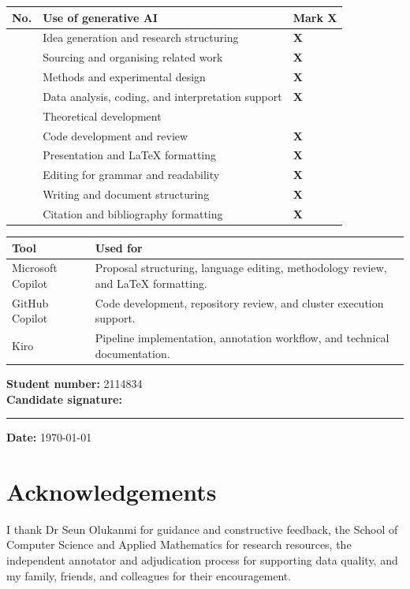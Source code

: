 \documentclass[11pt,a4paper]{article}
\newcommand{\AIyes}{\textbf{X}}
\newcommand{\AIno}{\phantom{X}}
\begin{document}
\vspace{0.35cm}
\begin{tabularx}{\textwidth}{|>{\centering\arraybackslash}p{0.8cm}|Y|>{\centering\arraybackslash}p{1.3cm}|}
\hline
\textbf{No.} & \textbf{Use of generative AI} & \textbf{Mark X}\\  & Idea generation and research structuring & \AIyes\\  & Sourcing and organising related work & \AIyes\\  & Methods and experimental design & \AIyes\\  & Data analysis, coding, and interpretation support & \AIyes\\  & Theoretical development & \AIno\\  & Code development and review & \AIyes\\  & Presentation and LaTeX formatting & \AIyes\\  & Editing for grammar and readability & \AIyes\\  & Writing and document structuring & \AIyes\\  & Citation and bibliography formatting & \AIyes\\ \hline
\end{tabularx}

\vspace{0.4cm}
\begin{tabularx}{\textwidth}{|p{3.4cm}|Y|}
\hline
\textbf{Tool} & \textbf{Used for}\\ \hline
Microsoft Copilot & Proposal structuring, language editing, methodology review, and LaTeX formatting.\\ \hline
GitHub Copilot & Code development, repository review, and cluster execution support.\\ \hline
Kiro & Pipeline implementation, annotation workflow, and technical documentation.\\ \hline
\end{tabularx}

\vfill
\noindent\textbf{Student number:} 2114834\\[0.45cm]
\textbf{Candidate signature:} \rule{6cm}{0.4pt}\hfill \textbf{Date:} \today
\normalsize

\clearpage
\section*{Acknowledgements}
I thank Dr Seun Olukanmi for guidance and constructive feedback, the School of Computer Science and Applied Mathematics for research resources, the independent annotator and adjudication process for supporting data quality, and my family, friends, and colleagues for their encouragement.
\end{document}
